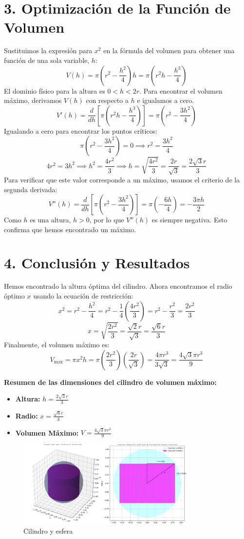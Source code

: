 \documentclass[12pt, letterpaper]{article}
\begin{document}
\section*{3. Optimización de la Función de Volumen}
Sustituimos la expresión para $x^2$ en la fórmula del volumen para obtener una función de una sola variable, $h$:
$$ V(h) = \pi \left(r^2 - \frac{h^2}{4}\right) h = \pi \left(r^2h - \frac{h^3}{4}\right) $$
El dominio físico para la altura es $0 < h < 2r$. Para encontrar el volumen máximo, derivamos $V(h)$ con respecto a $h$ e igualamos a cero.
$$ V'(h) = \frac{d}{dh} \left[ \pi \left(r^2h - \frac{h^3}{4}\right) \right] = \pi \left(r^2 - \frac{3h^2}{4}\right) $$
Igualando a cero para encontrar los puntos críticos:
$$ \pi \left(r^2 - \frac{3h^2}{4}\right) = 0 \implies r^2 = \frac{3h^2}{4} $$
$$ 4r^2 = 3h^2 \implies h^2 = \frac{4r^2}{3} \implies h = \sqrt{\frac{4r^2}{3}} = \frac{2r}{\sqrt{3}} = \frac{2\sqrt{3}r}{3} $$
Para verificar que este valor corresponde a un máximo, usamos el criterio de la segunda derivada:
$$ V''(h) = \frac{d}{dh} \left[ \pi \left(r^2 - \frac{3h^2}{4}\right) \right] = \pi \left(-\frac{6h}{4}\right) = -\frac{3\pi h}{2} $$
Como $h$ es una altura, $h>0$, por lo que $V''(h)$ es siempre negativa. Esto confirma que hemos encontrado un máximo.

\section*{4. Conclusión y Resultados}
Hemos encontrado la altura óptima del cilindro. Ahora encontramos el radio óptimo $x$ usando la ecuación de restricción:
$$ x^2 = r^2 - \frac{h^2}{4} = r^2 - \frac{1}{4}\left(\frac{4r^2}{3}\right) = r^2 - \frac{r^2}{3} = \frac{2r^2}{3} $$
$$ x = \sqrt{\frac{2r^2}{3}} = \frac{\sqrt{2}r}{\sqrt{3}} = \frac{\sqrt{6}r}{3} $$
Finalmente, el volumen máximo es:
$$ V_{\text{max}} = \pi x^2 h = \pi \left(\frac{2r^2}{3}\right) \left(\frac{2r}{\sqrt{3}}\right) = \frac{4\pi r^3}{3\sqrt{3}} = \frac{4\sqrt{3}\pi r^3}{9} $$

\vspace{0.5cm}

\textbf{Resumen de las dimensiones del cilindro de volumen máximo:}
\begin{itemize}
    \item \textbf{Altura:} $h = \frac{2\sqrt{3}r}{3}$
    \item \textbf{Radio:} $x = \frac{\sqrt{6}r}{3}$
    \item \textbf{Volumen Máximo:} $V = \frac{4\sqrt{3}\pi r^3}{9}$
\end{itemize}

\begin{figure}[h!]
    \centering
    \includegraphics[width=0.8\textwidth]{Figure_7.png}
    \caption{Cilindro y esfera}
    \label{fig:Figure_2}
\end{figure}
\end{document}
